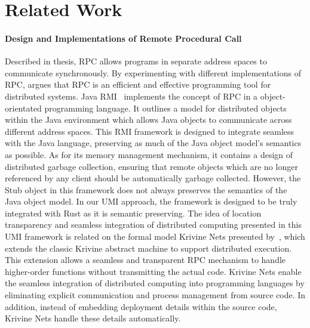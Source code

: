 \section{Related Work}
\label{chap3:related-work}
\paragraph*{Design and Implementations of Remote Procedural Call}
Described in  thesis, RPC allows programs in separate address spaces to communicate synchronously. By experimenting with different implementations of RPC, \citet{10.5555/910306} argues that RPC is an efficient and effective programming tool for distributed systems. Java RMI~\citep{10.5555/1268049.1268066} implements the concept of RPC in a object-orientated programming language. It outlines a model for distributed objects within the Java environment which allows Java objects to communicate across different address spaces. This RMI framework is designed to integrate seamless with the Java language, preserving as much of the Java object model's semantics as possible. As for its memory management mechanism, it contains a design of distributed garbage collection, ensuring that remote objects which are no longer referenced by any client should be automatically garbage collected. However, the Stub object in this framework does not always preserves the semantics of the Java object model. In our UMI approach, the framework is designed to be truly integrated with Rust as it is semantic preserving. The idea of location transparency and seamless integration of distributed computing presented in this UMI framework is related on the formal model Krivine Nets presented by~\citet{10.1145/2692915.2628152}, which extends the classic Krivine abstract machine to support distributed execution. This extension allows a seamless and transparent RPC mechanism to handle higher-order functions without transmitting the actual code. Krivine Nets enable the seamless integration of distributed computing into programming languages by eliminating explicit communication and process management from source code. In addition, instead of embedding deployment details within the source code, Krivine Nets handle these details automatically.

